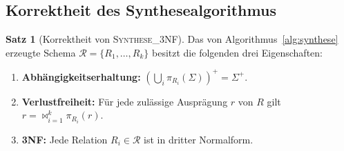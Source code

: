 ﻿\documentclass[a4paper,12pt]{report}
\theoremstyle{definition}
\newtheorem{theorem}{Satz}[chapter]
\theoremstyle{remark}
\begin{document}
\subsection{Korrektheit des Synthesealgorithmus}

\begin{theorem}[Korrektheit von \textsc{Synthese\_3NF}]
\label{thm:synthese-korrekt}
Das von Algorithmus~\ref{alg:synthese} erzeugte Schema
$\mathcal{R}=\{R_1,\ldots,R_k\}$ besitzt die folgenden drei
Eigenschaften:
\begin{enumerate}
  \item[(K1)] \textbf{Abhängigkeitserhaltung:} $(\bigcup_{i}
    \pi_{R_i}(\Sigma))^+ = \Sigma^+$.
  \item[(K2)] \textbf{Verlustfreiheit:} Für jede zulässige Ausprägung
    $r$ von $R$ gilt $r = \Join_{i=1}^{k}\pi_{R_i}(r)$.
  \item[(K3)] \textbf{3NF:} Jede Relation $R_i\in\mathcal{R}$ ist in
    dritter Normalform.
\end{enumerate}
\end{theorem}
\end{document}
